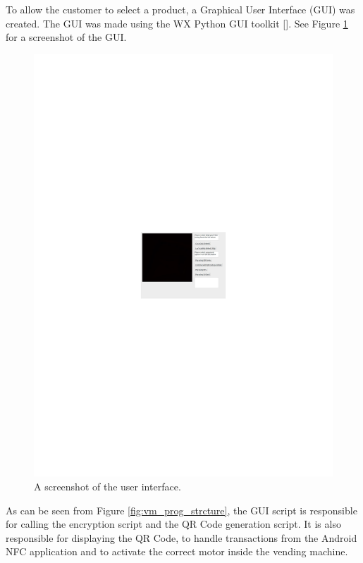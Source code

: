 To allow the customer to select a product, a Graphical User Interface (GUI) was
created. The GUI was made using the WX Python GUI toolkit
[\cite{website:wx-python}].
See Figure \ref{fig:gui-screenshot} for a screenshot of the
GUI.

\begin{figure}
 \centering 
 \includegraphics[scale=0.4]{gui_screenshot}
 \caption{A screenshot of the user interface.}
 \label{fig:gui-screenshot}
\end{figure}

As can be seen from Figure \ref{fig:vm_prog_strcture}, the GUI script is
responsible for calling the encryption script and the QR Code generation script.
It is also responsible for displaying the QR Code, to handle transactions from
the Android NFC application and to activate the correct motor inside the vending
machine. 

